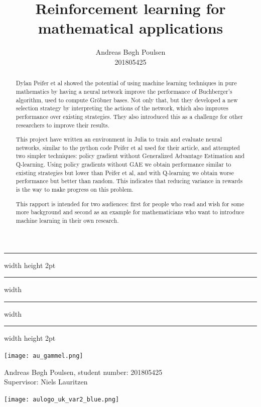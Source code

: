 \documentclass{article}
\title{Reinforcement learning for mathematical applications}
\author{
    Andreas Bøgh Poulsen\\
    201805425
}
\theoremstyle{changedot}
\theoremstyle{changedotbreak}
\theoremstyle{nonumberplain}
\begin{document}
\begin{titlepage}
  \center \sc
  \hrule width \hsize height 2pt \kern 1mm \hrule width \hsize
  \vspace{4mm}
  \vspace{6mm}
  \hrule width \hsize \kern 1mm \hrule width \hsize height 2pt
  \vspace{10mm}

  \vspace{10mm}

  \texttt{[image: au\_gammel.png]}

  \vspace{15mm}

  {\large Andreas Bøgh Poulsen, student number: 201805425 \\ Supervisor: Niels Lauritzen}

  \vspace{7mm}

  \texttt{[image: aulogo\_uk\_var2\_blue.png]}
\end{titlepage}

\begin{abstract}
  Dylan Peifer et al \cite{peifer} showed the potential of using machine learning techniques in pure mathematics by having a neural network improve the performance of Buchberger's algorithm, used to compute Gröbner bases. Not only that, but they developed a new selection strategy by interpreting the actions of the network, which also improves performance over existing strategies. They also introduced this as a challenge for other researchers to improve their results.

  This project have written an environment in Julia to train and evaluate neural networks, similar to the python code Peifer et al used for their article, and attempted two simpler techniques: policy gradient without Generalized Advantage Estimation and Q-learning. Using policy gradients without GAE we obtain performance similar to existing strategies but lower than Peifer et al, and with Q-learning we obtain worse performance but better than random. This indicates that reducing variance in rewards is the way to make progress on this problem.

  This rapport is intended for two audiences: first for people who read \cite{peifer} and wish for some more background and second as an example for mathematicians who want to introduce machine learning in their own research.
\end{abstract}
\end{document}
